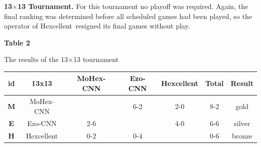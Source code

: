 \documentclass{icga}
\def\Ec{\mbox{\sc Ezo-CNN}}
\def\Hent{\mbox{\sc Hexcellent}}
\def\Mc{\mbox{\sc MoHex-CNN}}
\begin{document}
\newpage
{\large\bf 13$\times$13 Tournament.}
For this tournament no playoff was required.
Again, the final ranking was determined before
all scheduled games had been played,
so the operator of \Hent\ resigned its final games
without play.

\begin{center}
{\bf Table 2

The results of the 13$\times$13 tournament
}

\begin{tabular}{|c|c|c|c|c|c|c|}
\hline {\bf id} & {\bf 13x13} &\Mc{} &\Ec{}  &\Hent{} 
                & {\bf Total} & {\bf Result} \\ 
\hline {\bf M} & \Mc{}         &      &  6-2  & 2-0  & 8-2   & gold \\
\hline {\bf E} & \Ec{}         &  2-6 &       & 4-0  & 6-6   & silver \\
\hline {\bf H} & \Hent{}       &  0-2 &  0-4  &      & 0-6   & bronze \\
\hline
\end{tabular}
\end{center}
\end{document}
